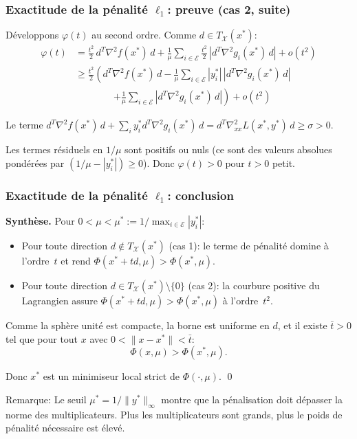 \documentclass[t,usepdftitle=false,aspectratio=169]{beamer}
\def\blue{\color{blue}}
\def\cE{\mathcal{E}}
\def\cX{\mathcal{X}}
\begin{document}
\begin{frame}
\frametitle{Exactitude de la pénalité $\ell_1$: preuve (cas 2, suite)}

Développons $\varphi(t)$ au second ordre. Comme $d \in T_{\cX}(x^*)$:
\begin{align*}
\varphi(t)
&= \frac{t^2}{2}\,d^T\nabla^2 f(x^*)\,d + \frac{1}{\mu}\sum_{i \in \cE}\frac{t^2}{2}\,|d^T\nabla^2 g_i(x^*)\,d| + o(t^2) \\
&\geq \frac{t^2}{2}\left(d^T\nabla^2 f(x^*)\,d - \frac{1}{\mu}\sum_{i \in \cE}|y_i^*|\,|d^T\nabla^2 g_i(x^*)\,d|\right. \\
&\qquad\qquad\left.+ \frac{1}{\mu}\sum_{i \in \cE}|d^T\nabla^2 g_i(x^*)\,d|\right) + o(t^2)
\end{align*}

\mbox{}

Le terme $d^T\nabla^2 f(x^*)\,d + \sum_i y_i^* d^T\nabla^2 g_i(x^*)\,d = d^T\nabla^2_{xx}L(x^*,y^*)\,d \geq \sigma > 0$.

\mbox{}

Les termes résiduels en $1/\mu$ sont positifs ou nuls (ce sont des valeurs absolues pondérées par $(1/\mu - |y_i^*|) \geq 0$). Donc $\varphi(t) > 0$ pour $t > 0$ petit.

\end{frame}

\begin{frame}
\frametitle{Exactitude de la pénalité $\ell_1$: conclusion}

\textbf{Synthèse.}
Pour $0 < \mu < \mu^* := 1/\max_{i \in \cE}|y_i^*|$:

\begin{itemize}
\item 
Pour toute direction $d \notin T_{\cX}(x^*)$ (cas 1): le terme de pénalité domine à l'ordre~$t$ et rend $\Phi(x^*+td,\mu) > \Phi(x^*,\mu)$.
\item
Pour toute direction $d \in T_{\cX}(x^*)\setminus\{0\}$ (cas 2): la courbure positive du Lagrangien assure $\Phi(x^*+td,\mu) > \Phi(x^*,\mu)$ à l'ordre~$t^2$.
\end{itemize}

\mbox{}

Comme la sphère unité est compacte, la borne est uniforme en $d$, et il existe $\bar{t} > 0$ tel que pour tout $x$ avec $0 < \|x - x^*\| < \bar{t}$:
$$
\Phi(x, \mu) > \Phi(x^*, \mu).
$$

Donc $x^*$ est un minimiseur local strict de $\Phi(\cdot, \mu)$. \qed

\mbox{}

{\blue Remarque:} Le seuil $\mu^* = 1/\|y^*\|_\infty$ montre que la pénalisation doit dépasser la norme des multiplicateurs. Plus les multiplicateurs sont grands, plus le poids de pénalité nécessaire est élevé.

\end{frame}
\end{document}
